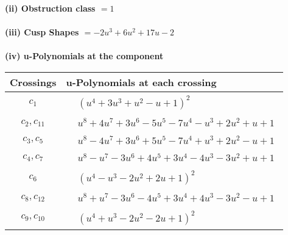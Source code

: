 \documentclass[1p]{elsarticle_modified}
\theoremstyle{definition}
\begin{document}
\flushleft \textbf{(ii) Obstruction class $= 1$}\\~\\
\flushleft \textbf{(iii) Cusp Shapes $= -2 u^3+6 u^2+17 u-2$}\\~\\
\newpage\renewcommand{\arraystretch}{1}
\flushleft \textbf{(iv) u-Polynomials at the component}\newline \\
\begin{tabular}{m{50pt}|m{274pt}}
Crossings & \hspace{64pt}u-Polynomials at each crossing \\
\hline $$\begin{aligned}c_{1}\end{aligned}$$&$\begin{aligned}
&(u^4+3 u^3+u^2- u+1)^2
\end{aligned}$\\
\hline $$\begin{aligned}c_{2},c_{11}\end{aligned}$$&$\begin{aligned}
&u^8+4 u^7+3 u^6-5 u^5-7 u^4- u^3+2 u^2+u+1
\end{aligned}$\\
\hline $$\begin{aligned}c_{3},c_{5}\end{aligned}$$&$\begin{aligned}
&u^8-4 u^7+3 u^6+5 u^5-7 u^4+u^3+2 u^2- u+1
\end{aligned}$\\
\hline $$\begin{aligned}c_{4},c_{7}\end{aligned}$$&$\begin{aligned}
&u^8- u^7-3 u^6+4 u^5+3 u^4-4 u^3-3 u^2+u+1
\end{aligned}$\\
\hline $$\begin{aligned}c_{6}\end{aligned}$$&$\begin{aligned}
&(u^4- u^3-2 u^2+2 u+1)^2
\end{aligned}$\\
\hline $$\begin{aligned}c_{8},c_{12}\end{aligned}$$&$\begin{aligned}
&u^8+u^7-3 u^6-4 u^5+3 u^4+4 u^3-3 u^2- u+1
\end{aligned}$\\
\hline $$\begin{aligned}c_{9},c_{10}\end{aligned}$$&$\begin{aligned}
&(u^4+u^3-2 u^2-2 u+1)^2
\end{aligned}$\\
\hline
\end{tabular}\\~\\
\end{document}
